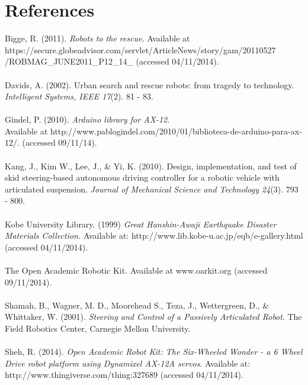 \documentclass[]{article}
\begin{document}
\section{References}
Bigge, R. (2011). \textit{Robots to the rescue}. Available at\\
https://secure.globeadvisor.com/servlet/ArticleNews/story/gam/20110527\\
/ROBMAG\_JUNE2011\_P12\_14\_ (accessed 04/11/2014).\\
\\
Davids, A. (2002). Urban search and rescue robots: from tragedy to technology. \textit{Intelligent Systems, IEEE 17}(2). 81 - 83.\\
\\
Gindel, P. (2010). \textit{Arduino library for AX-12}. \\Available at http://www.pablogindel.com/2010/01/biblioteca-de-arduino-para-ax-12/. (accessed 09/11/14).\\
\\
Kang, J., Kim W., Lee, J., \& Yi, K. (2010). Design, implementation, and test of skid steering-based autonomous driving controller for a robotic vehicle with articulated suspension. \textit{Journal of Mechanical Science and Technology 24}(3). 793 - 800.\\
\\
Kobe University Library. (1999) \textit{Great Hanshin-Awaji Earthquake Disaster Materials Collection.} Available at: http://www.lib.kobe-u.ac.jp/eqb/e-gallery.html (accessed 04/11/2014).\\
\\
The Open Academic Robotic Kit. Available at www.oarkit.org (accessed 09/11/2014).\\
\\
Shamah, B.,  Wagner, M. D., Moorehead S., Teza, J., Wettergreen, D., \& Whittaker, W. (2001). \textit{Steering and Control of a Passively Articulated Robot}. The Field Robotics Center, Carnegie Mellon University.\\
\\
Sheh, R. (2014). \textit{Open Academic Robot Kit: The Six-Wheeled Wonder - a 6 Wheel Drive robot platform using Dynamixel AX-12A servos}. Available at: http://www.thingiverse.com/thing:327689 (accessed 04/11/2014).
\end{document}
